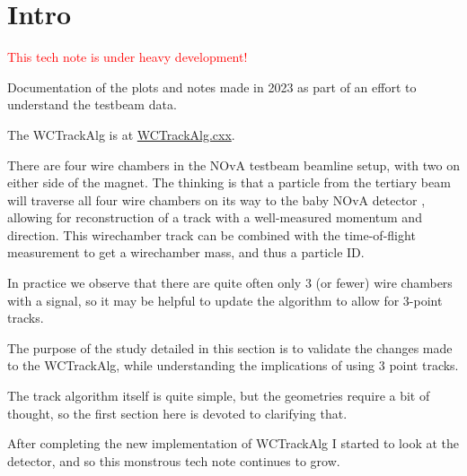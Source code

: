 \section{Intro}

\textcolor{red}{This tech note is under heavy development!}

Documentation of the plots and notes made in 2023 as part of an effort to understand the testbeam data.

The WCTrackAlg is at \href{https://github.com/novaexperiment/novasoft/blob/feature/lasquith_tracking/BeamlineReco/WCTrackAlg.cxx}{WCTrackAlg.cxx}.


There are four wire chambers in the NOvA testbeam beamline setup, with two on either side of the magnet. The thinking is that a particle from the tertiary beam will traverse all four wire chambers on its way to the baby NOvA detector , allowing for reconstruction of a track with a well-measured momentum and direction. This wirechamber track can be combined with the time-of-flight measurement to get a wirechamber mass, and thus a particle ID.

In practice we observe that there are quite often only 3 (or fewer) wire chambers with a signal, so it may be helpful to update the algorithm to allow for 3-point tracks. 

The purpose of the study detailed in this section is to validate the changes made to the WCTrackAlg, while understanding the implications of using 3 point tracks.

The track algorithm itself is quite simple, but the geometries require a bit of thought, so the first section here is devoted to clarifying that.

After completing the new implementation of WCTrackAlg I started to look at the detector, and so this monstrous tech note continues to grow.
